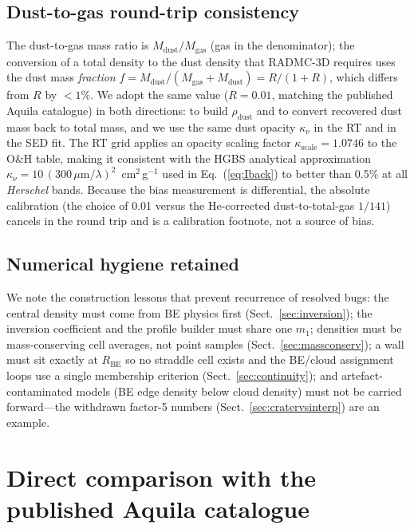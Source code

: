 \documentclass[11pt,a4paper]{article}
\newcommand{\Rbe}{R_{\mathrm{BE}}}
\begin{document}
\subsection{Dust-to-gas round-trip consistency}

The dust-to-gas mass ratio is $M_{\mathrm{dust}}/M_{\mathrm{gas}}$ (gas in
the denominator); the conversion of a total density to the dust density that
RADMC-3D requires uses the dust mass \emph{fraction}
$f = M_{\mathrm{dust}}/(M_{\mathrm{gas}}+M_{\mathrm{dust}}) = R/(1+R)$,
which differs from $R$ by $<1\%$. We adopt the same value
($R=0.01$, matching the published Aquila catalogue) in both directions:
to build $\rho_{\mathrm{dust}}$ and to convert recovered dust mass back to
total mass, and we use the same dust opacity $\kappa_\nu$ \citep{Ossenkopf+Henning1994}
in the RT and in the SED fit. The RT grid applies an opacity scaling factor
$\kappa_{\mathrm{scale}}=1.0746$ to the O\&H table, making it consistent with
the HGBS analytical approximation $\kappa_\nu=10\,(300\,\mu\mathrm{m}/\lambda)^{2}$\,
cm$^{2}$\,g$^{-1}$ used in Eq.~(\ref{eq:Iback}) to better than 0.5\% at all
\emph{Herschel} bands. Because the bias measurement is differential, the absolute calibration
(the choice of 0.01 versus the He-corrected dust-to-total-gas $1/141$)
cancels in the round trip and is a calibration footnote, not a source of
bias.

\subsection{Numerical hygiene retained}

We note the construction lessons that prevent recurrence of resolved bugs:
the central density must come from BE physics first
(Sect.~\ref{sec:inversion}); the inversion coefficient and the profile
builder must share one $m_{1}$; densities must be mass-conserving cell
averages, not point samples (Sect.~\ref{sec:massconserv}); a wall must sit
exactly at $\Rbe$ so no straddle cell exists and the BE/cloud assignment
loops use a single membership criterion (Sect.~\ref{sec:continuity}); and
artefact-contaminated models (BE edge density below cloud density) must not
be carried forward---the withdrawn factor-5 numbers
(Sect.~\ref{sec:cratervsinterp}) are an example.

\section{Direct comparison with the published Aquila catalogue}
\label{sec:konyves}
\end{document}
